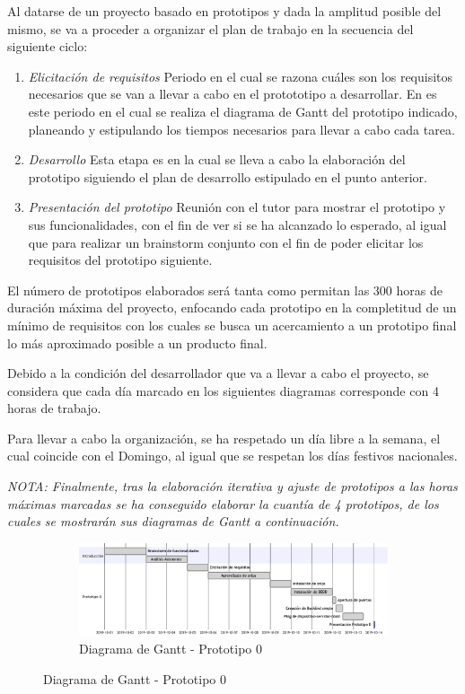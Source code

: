 Al datarse de un proyecto basado en prototipos y dada la amplitud posible del mismo, se va a proceder a organizar el plan de trabajo en la secuencia del siguiente ciclo:
\begin{enumerate}
    \item \textit{Elicitación de requisitos} \newline
    Periodo en el cual se razona cuáles son los requisitos necesarios que se van a llevar a cabo en el protototipo a desarrollar. En es este periodo en el cual se realiza el diagrama de Gantt del prototipo indicado, planeando y estipulando los tiempos necesarios para llevar a cabo cada tarea.
    
    \item \textit{Desarrollo} \newline
    Esta etapa es en la cual se lleva a cabo la elaboración del prototipo siguiendo el plan de desarrollo estipulado en el punto anterior.
    
    \item \textit{Presentación del prototipo} \newline
    Reunión con el tutor para mostrar el prototipo y sus funcionalidades, con el fin de ver si se ha alcanzado lo esperado, al igual que para realizar un brainstorm conjunto con el fin de poder elicitar los requisitos del prototipo siguiente.
\end{enumerate}

El número de prototipos elaborados será tanta como permitan las 300 horas de duración máxima del proyecto, enfocando cada prototipo en la completitud de un mínimo de requisitos con los cuales se busca un acercamiento a un prototipo final lo más aproximado posible a un producto final.

Debido a la condición del desarrollador que va a llevar a cabo el proyecto, se considera que cada día marcado en los siguientes diagramas corresponde con 4 horas de trabajo.

Para llevar a cabo la organización, se ha respetado un día libre a la semana, el cual coincide con el Domingo, al igual que se respetan los días festivos nacionales.

\textit{NOTA: Finalmente, tras la elaboración iterativa y ajuste de prototipos a las horas máximas marcadas se ha conseguido elaborar la cuantía de 4 prototipos, de los cuales se mostrarán sus diagramas de Gantt a continuación.}

\begin{figure}
\begin{figure}[H]
    \centering
    \includegraphics[width=19cm]{./img/grantt/p0.png}
    \caption{Diagrama de Gantt - Prototipo 0}
    \label{fig:grant.p0}
\end{figure}
\end{figure}

